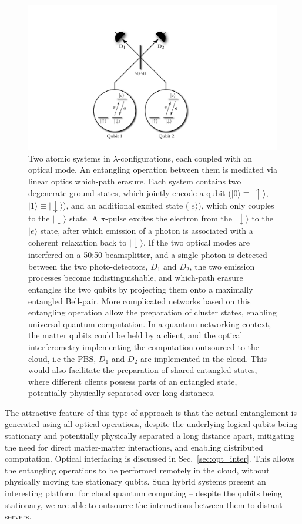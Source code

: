 \documentclass[aps, rmp, twocolumn, amsmath, amssymb, nofootinbib, superscriptaddress, longbibliography, floatfix, table-of-contents, eqsecnum]{revtex4-1}
\newcommand{\ket}[1]{|#1\rangle}
\begin{document}
\begin{figure}[!htb]
\includegraphics[width=0.75\columnwidth]{barrett_kok}
\caption{Two atomic systems in $\lambda$-configurations, each coupled with an optical mode. An entangling operation between them is mediated via linear optics which-path erasure. Each system contains two degenerate ground states, which jointly encode a qubit (\mbox{$\ket{0}\equiv\ket{\!\uparrow}$}, \mbox{$\ket{1}\equiv\ket{\!\downarrow}$}), and an additional excited state ($\ket{e}$), which only couples to the $\ket{\!\downarrow}$ state. A $\pi$-pulse excites the electron from the $\ket{\!\downarrow}$ to the $\ket{e}$ state, after which emission of a photon is associated with a coherent relaxation back to $\ket{\!\downarrow}$. If the two optical modes are interfered on a 50:50 beamsplitter, and a single photon is detected between the two photo-detectors, $D_1$ and $D_2$, the two emission processes become indistinguishable, and which-path erasure entangles the two qubits by projecting them onto a maximally entangled Bell-pair. More complicated networks based on this entangling operation allow the preparation of cluster states, enabling universal quantum computation. In a quantum networking context, the matter qubits could be held by a client, and the optical interferometry implementing the computation outsourced to the cloud, i.e the PBS, $D_1$ and $D_2$ are implemented in the cloud. This would also facilitate the preparation of shared entangled states, where different clients possess parts of an entangled state, potentially physically separated over long distances.} \label{fig:barrett_kok}
\end{figure}

The attractive feature of this type of approach is that the actual entanglement is generated using all-optical operations, despite the underlying logical qubits being stationary and potentially physically separated a long distance apart, mitigating the need for direct matter-matter interactions, and enabling distributed computation. Optical interfacing is discussed in Sec.~\ref{sec:opt_inter}. This allows the entangling operations to be performed remotely in the cloud, without physically moving the stationary qubits. Such hybrid systems present an interesting platform for cloud quantum computing -- despite the qubits being stationary, we are able to outsource the interactions between them to distant servers.
\end{document}
